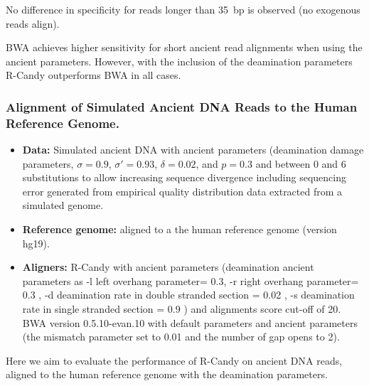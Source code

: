 \documentclass[11pt,a4paper]{report}
\begin{document}
No difference in specificity for reads longer than 35~bp is observed
(no exogenous reads align).


BWA achieves higher sensitivity for short 
ancient read alignments when using the ancient parameters. 
However, with the inclusion of the deamination parameters R-Candy 
outperforms BWA in all cases.



\subsubsection{Alignment of Simulated Ancient DNA Reads to the Human Reference Genome.}
\label{Alignment of Simulated Ancient DNA Reads to the Human Reference Genome.}
 
 \begin{itemize}
 
    \item \textbf{Data:} Simulated ancient DNA 
     with ancient parameters (deamination damage parameters, $ \sigma = 0.9$, 
    $ \sigma' = 0.93 $, $\delta = 0.02 $,  and $p = 0.3 $ and 
    between 0 and 6 substitutions to allow increasing sequence divergence
    including sequencing error generated from empirical quality distribution data
    extracted from a simulated genome.
  
   \item \textbf{Reference genome:} aligned to a the human reference genome (version hg19).

 
    \item \textbf{Aligners:} 
R-Candy with ancient parameters 
(deamination ancient parameters as -l left overhang parameter= 0.3, -r 
right overhang parameter= 0.3 , 
-d deamination rate in double stranded section = 0.02 , 
-s deamination rate in single stranded section = 0.9 )
 and alignments score cut-off of 20. \\
BWA version 0.5.10-evan.10 with default parameters and ancient parameters 
(the mismatch parameter set to 0.01 
and the number of gap opens to 2)\cite{green2010draft}.
 
  \end{itemize}
 

Here we aim to evaluate the performance of R-Candy on ancient DNA reads, 
aligned to the human reference genome with the deamination parameters.
\end{document}

